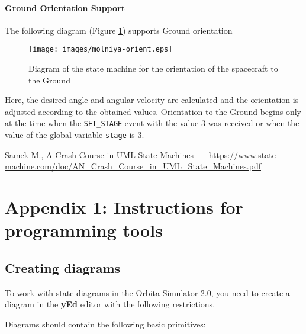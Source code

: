 \documentclass[12pt,a4paper]{article}
\begin{document}
\clearpage
\paragraph{Ground Orientation Support} The following diagram (Figure \ref{Pic:Molniya-orient-en}) supports Ground orientation

\begin{figure}[tbh]
  \begin{center}
    \texttt{[image: images/molniya-orient.eps]}
    \caption{Diagram of the state machine for the orientation of the spacecraft to the Ground}
    \label{Pic:Molniya-orient-en}
  \end{center}
\end{figure}

Here, the desired angle and angular velocity are calculated and the orientation is adjusted according to the obtained values.
Orientation to the Ground begins only at the time when the \verb'SET_STAGE' event with the value 3 was received or when the value of the global variable \verb'stage' is 3.

\begin{thebibliography}{2}
 Samek M., A Crash Course in UML State Machines~---
  \url{https://www.state-machine.com/doc/AN_Crash_Course_in_UML_State_Machines.pdf}
\end{thebibliography}

\clearpage
\section*{Appendix 1: Instructions for programming tools}

\subsection*{Creating diagrams}

To work with state diagrams in the Orbita Simulator 2.0, you need to create a diagram in the \textbf{yEd} editor with the following restrictions.

Diagrams should contain the following basic primitives:
\end{document}
